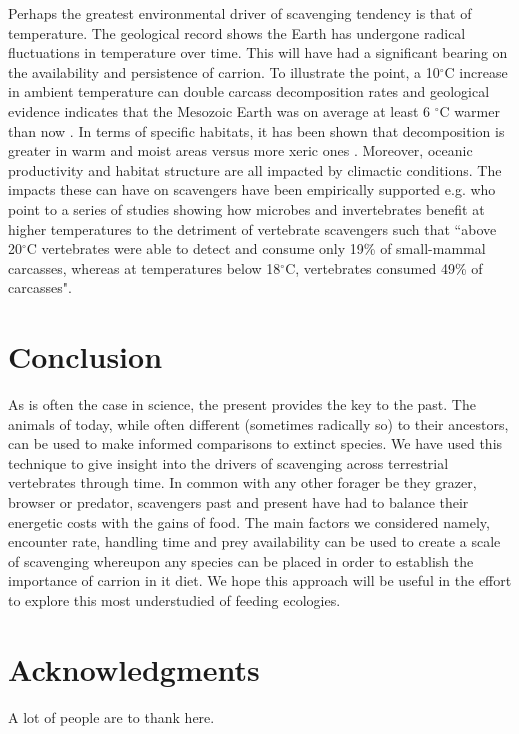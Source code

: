 \documentclass[a4paper,12pt]{article}
\begin{document}
Perhaps the greatest environmental driver of scavenging tendency is that of temperature. 
The geological record shows the Earth has undergone radical fluctuations in temperature over time.
This will have had a significant bearing on the availability and persistence of carrion.
To illustrate the point, a 10$^{\circ}$C increase in ambient temperature can double carcass decomposition rates \citep{parmenter2009carrion} and geological evidence indicates that the Mesozoic Earth was on average at least 6 $^{\circ}$C warmer than now \citep{sellwood2006mesozoic}.
In terms of specific habitats, it has been shown that decomposition is greater in warm and moist areas versus more xeric ones \citep{beasley2015vertebrates}.
Moreover, oceanic productivity and habitat structure are all impacted by climactic conditions.
The impacts these can have on scavengers have been empirically supported e.g. \cite{beasley2015vertebrates} who point to a series of studies showing how microbes and invertebrates benefit at higher temperatures to the detriment of vertebrate scavengers such that ``above 20$^{\circ}$C vertebrates were able to detect and consume only 19\% of small-mammal carcasses, whereas at temperatures below 18$^{\circ}$C, vertebrates consumed 49\% of carcasses".


\section*{Conclusion} 
As is often the case in science, the present provides the key to the past.
The animals of today, while often different (sometimes radically so) to their ancestors, can be used to make informed comparisons to extinct species. 
We have used this technique to give insight into the drivers of scavenging across terrestrial vertebrates through time.
In common with any other forager be they grazer, browser or predator, scavengers past and present have had to balance their energetic costs with the gains of food. 
The main factors we considered namely, encounter rate, handling time and prey availability can be used to create a scale of scavenging whereupon any species can be placed in order to establish the importance of carrion in it diet.  
We hope this approach will be useful in the effort to explore this most understudied of feeding ecologies. 


\section*{Acknowledgments}

A lot of people are to thank here.


\newpage



\end{document}
